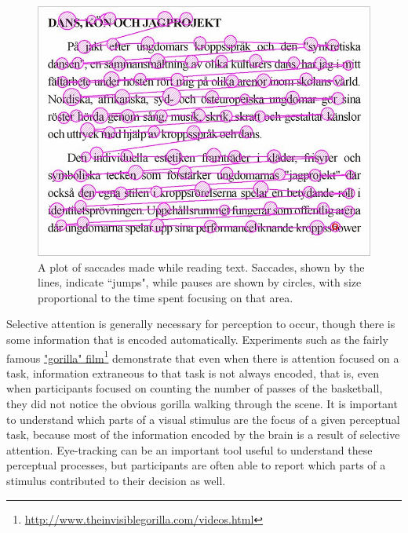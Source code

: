 \documentclass[11pt]{isuthesis}
\begin{document}
\begin{figure}[h]
\centering
\includegraphics[width=.5\textwidth]{SaccadesText}
\caption{A plot of saccades made while reading text. Saccades, shown by the lines, indicate ``jumps", while pauses are shown by circles, with size proportional to the time spent focusing on that area.}\label{fig:saccadestext}
\end{figure}

Selective attention is generally necessary for perception to occur, though there is some information that is encoded automatically. Experiments such as the fairly famous \href{http://www.theinvisiblegorilla.com/videos.html}{"gorilla" film}\footnote{\url{http://www.theinvisiblegorilla.com/videos.html}} demonstrate that even when there is attention focused on a task, information extraneous to that task is not always encoded, that is, even when participants focused on counting the number of passes of the basketball, they did not notice the obvious gorilla walking through the scene. It is important to understand which parts of a visual stimulus are the focus of a given perceptual task, because most of the information encoded by the brain is a result of selective attention. Eye-tracking can be an important tool useful to understand these perceptual processes, but participants are often able to report which parts of a stimulus contributed to their decision as well.
\end{document}
